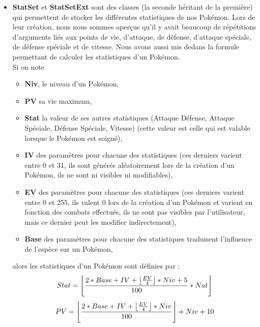 \begin{itemize}
\item  \textbf{StatSet} et \textbf{StatSetExt} sont des classes (la seconde héritant de la première) qui permettent de stocker les différentes statistiques de nos Pokémon. Lors de leur création, nous nous sommes aperçus qu'il y avait beaucoup de répétitions d'arguments liés aux points de vie, d'attaque, de défense, d'attaque spéciale, de défense spéciale et de vitesse. Nous avons aussi mis dedans la formule permettant de calculer les statistiques d'un Pokémon. \\
Si on note
\begin{itemize}
\item \textbf{Niv}, le niveau d'un Pokémon, \\
\item \textbf{PV} sa vie maximum, \\
\item \textbf{Stat} la valeur de ses autres statistiques (Attaque Défense, Attaque Spéciale, Défense Spéciale, Vitesse) (cette valeur est celle qui est valable lorsque le Pokémon est soigné), \\
\item \textbf{IV} des paramètres pour chacune des statistiques (ces derniers varient entre 0 et 31, ils sont générés aléatoirement lors de la création d'un Pokémon, ils ne sont ni visibles ni modifiables),\\
\item \textbf{EV} des paramètres pour chacune des statistiques (ces derniers varient entre 0 et 255, ils valent 0 lors de la création d'un Pokémon et varient en fonction des combats effectués, ils ne sont pas visibles par l'utilisateur, mais ce dernier peut les modifier indirectement),\\
\item \textbf{Base} des paramètres pour chacune des statistiques traduisent l'influence de l'espèce sur un Pokémon,
\end{itemize}
alors les statistiques d'un Pokémon sont définies par :
\[
Stat = \left\lfloor \dfrac{2 * Base + IV + \left\lfloor \frac{EV}{4} \right\rfloor * Niv + 5}{100} * Nat \right\rfloor
\]
\[
PV =\left\lfloor \dfrac{2 * Base + IV + \left\lfloor \frac{EV}{4} \right\rfloor * Niv}{100} \right\rfloor + Niv + 10
\]
\end{itemize}